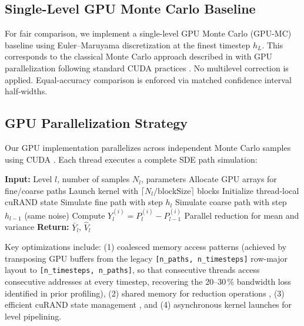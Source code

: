 \documentclass{ieeeaccess}
\begin{document}
\subsection{Single-Level GPU Monte Carlo Baseline}

For fair comparison, we implement a single-level GPU Monte Carlo (GPU-MC) baseline using
Euler--Maruyama discretization at the finest timestep $h_L$. This corresponds to the classical
Monte Carlo approach described in \cite{glasserman2003monte} with GPU parallelization following
standard CUDA practices \cite{nvidia2020cuda, owens2008, harris2007}. No multilevel correction
is applied. Equal-accuracy comparison is enforced via matched confidence interval half-widths.

\subsection{GPU Parallelization Strategy}

Our GPU implementation parallelizes across independent Monte Carlo samples using CUDA
\cite{nvidia2020cuda}. Each thread executes a complete SDE path simulation:

\begin{algorithm}
\caption{GPU Parallel MLMC Sampling (PyTorch CUDA tensors on A100; PyCUDA
\texttt{SourceModule} variant for compatible drivers)}
\label{alg:gpu}
\begin{algorithmic}[1]
\STATE \textbf{Input:} Level $l$, number of samples $N_l$, parameters
\STATE Allocate GPU arrays for fine/coarse paths
\STATE Launch kernel with $\lceil N_l / \text{blockSize} \rceil$ blocks
    \STATE Initialize thread-local cuRAND state
    \STATE Simulate fine path with step $h_l$
    \STATE Simulate coarse path with step $h_{l-1}$ (same noise)
    \STATE Compute $Y_l^{(i)} = P_l^{(i)} - P_{l-1}^{(i)}$
\ENDFOR
\STATE Parallel reduction for mean and variance \cite{harris2007}
\STATE \textbf{Return:} $\bar{Y}_l$, $\hat{V}_l$
\end{algorithmic}
\end{algorithm}

Key optimizations include: (1) coalesced memory access patterns
   (achieved by transposing GPU buffers from the legacy
   \texttt{[n\_paths, n\_timesteps]} row-major layout to
   \texttt{[n\_timesteps, n\_paths]}, so that consecutive threads access
   consecutive addresses at every timestep, recovering the 20--30\,\%
   bandwidth loss identified in prior profiling), (2) shared memory for
reduction operations \cite{harris2007}, (3) efficient cuRAND state management \cite{nvidia2020cuda},
and (4) asynchronous kernel launches for level pipelining.
\end{document}
